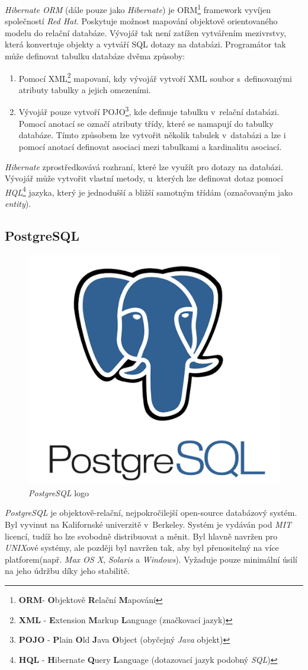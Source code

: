 \emph{Hibernate ORM} (dále pouze jako \emph{Hibernate}) je ORM\footnote{\textbf{ORM}- \textbf{O}bjektově \textbf{R}elační \textbf{M}apování} framework vyvíjen společností \emph{Red Hat}.
Poskytuje možnost mapování objektově orientovaného modelu do relační databáze.
Vývojář tak není zatížen vytvářením mezivrstvy, která konvertuje objekty a vytváří SQL dotazy na databázi.
Programátor tak může definovat tabulku databáze dvěma způsoby:
\begin{enumerate}
  \item Pomocí XML\footnote{\textbf{XML} - \textbf{E}xtension \textbf{M}arkup \textbf{L}anguage (značkovací jazyk)} mapovaní, kdy vývojář vytvoří XML soubor s~definovanými atributy tabulky a jejich omezeními.
  \item Vývojář pouze vytvoří POJO\footnote{\textbf{POJO} - \textbf{P}lain \textbf{O}ld \textbf{J}ava \textbf{O}bject (obyčejný \emph{Java} objekt)}, kde definuje tabulku v~relační databázi. Pomocí anotací se označí atributy třídy, které se namapují do tabulky databáze.
        Tímto způsobem lze vytvořit několik tabulek v~databázi a lze i pomocí anotací definovat asociaci mezi tabulkami a kardinalitu asociací.
\end{enumerate}
\emph{Hibernate} zprostředkovává rozhraní, které lze využít pro dotazy na databázi.
Vývojář může vytvořit vlastní metody, u~kterých lze definovat dotaz pomocí \emph{HQL}\footnote{\textbf{HQL} - \textbf{H}ibernate \textbf{Q}uery \textbf{L}anguage (dotazovací jazyk podobný \emph{SQL})} jazyka,
který je jednodušší a bližší samotným třídám (označovaným jako \emph{entity}).

\subsection*{PostgreSQL}
\label{pouzite:postgresql}
\begin{figure}[hbt]
  \centering
  \includegraphics[width=.2 \linewidth]{obrazky-figures/postgresql-logo.png}
  \caption{\emph{PostgreSQL} logo}
\end{figure}

\emph{PostgreSQL} je objektově-relační, nejpokročilejší open-source databázový systém.
Byl vyvinut na Kalifornské univerzitě v~Berkeley.
Systém je vydáván pod \emph{MIT} licencí, tudíž ho lze svobodně distribuovat a měnit.
Byl hlavně navržen pro \emph{UNIX}ové systémy, ale později byl navržen tak, aby byl přenositelný na více platforem(např. \emph{Max OS X}, \emph{Solaris} a \emph{Windows}).
Vyžaduje pouze minimální úsilí na jeho údržbu díky jeho stabilitě.~\cite{postgres:tutorial}

